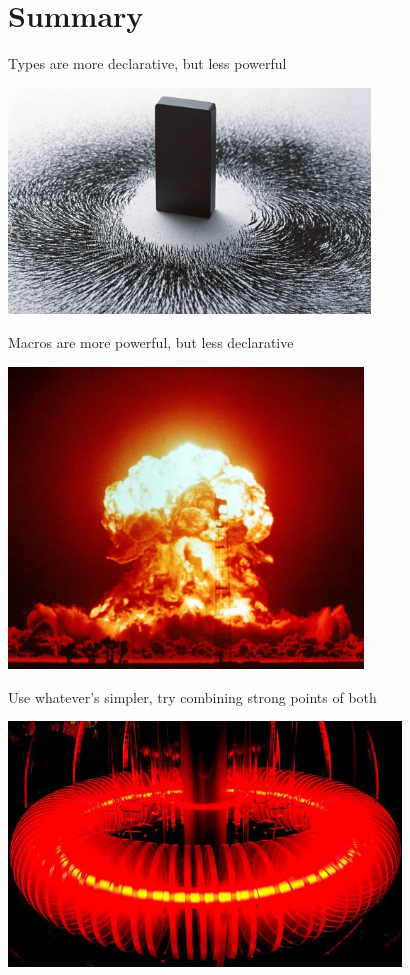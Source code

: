 \documentclass{beamer}
\begin{document}
  \section{Summary}

\begin{frame}[fragile]{Types are more declarative, but less powerful}
  \begin{center}
    \includegraphics[height=6cm]{img/magnet.jpg}
  \end{center}
\end{frame}

\begin{frame}[fragile]{Macros are more powerful, but less declarative}
  \begin{center}
    \includegraphics[height=8cm]{img/boom.jpg}
  \end{center}
\end{frame}

\begin{frame}[fragile]{Use whatever's simpler, try combining strong points of both}
  \begin{center}
    \includegraphics[height=6.5cm]{img/fusion.jpg}
  \end{center}
\end{frame}
\end{document}

